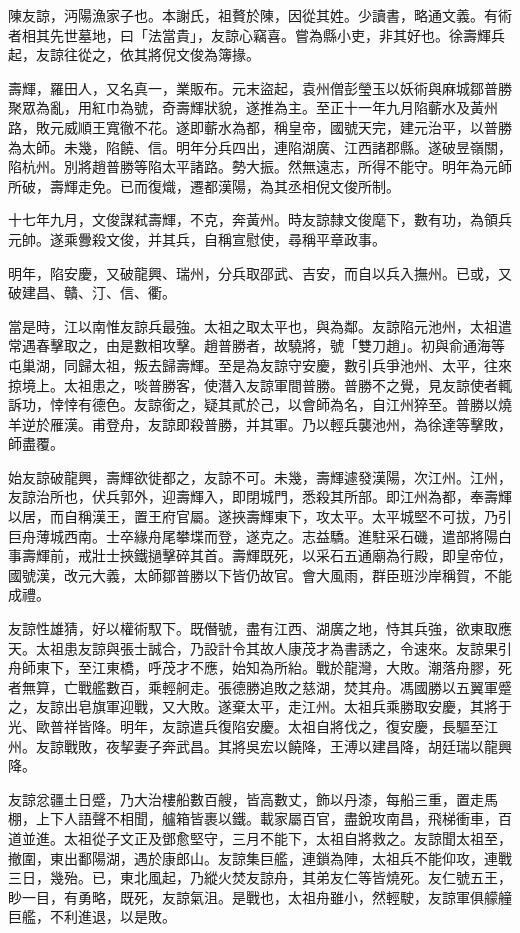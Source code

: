 

陳友諒，沔陽漁家子也。本謝氏，祖贅於陳，因從其姓。少讀書，略通文義。有術者相其先世墓地，曰「法當貴」，友諒心竊喜。嘗為縣小吏，非其好也。徐壽輝兵起，友諒往從之，依其將倪文俊為簿掾。

壽輝，羅田人，又名真一，業販布。元末盜起，袁州僧彭瑩玉以妖術與麻城鄒普勝聚眾為亂，用紅巾為號，奇壽輝狀貌，遂推為主。至正十一年九月陷蘄水及黃州路，敗元威順王寬徹不花。遂即蘄水為都，稱皇帝，國號天完，建元治平，以普勝為太師。未幾，陷饒、信。明年分兵四出，連陷湖廣、江西諸郡縣。遂破昱嶺關，陷杭州。別將趙普勝等陷太平諸路。勢大振。然無遠志，所得不能守。明年為元師所破，壽輝走免。已而復熾，遷都漢陽，為其丞相倪文俊所制。

十七年九月，文俊謀弒壽輝，不克，奔黃州。時友諒隸文俊麾下，數有功，為領兵元帥。遂乘釁殺文俊，并其兵，自稱宣慰使，尋稱平章政事。

明年，陷安慶，又破龍興、瑞州，分兵取邵武、吉安，而自以兵入撫州。已或，又破建昌、贛、汀、信、衢。

當是時，江以南惟友諒兵最強。太祖之取太平也，與為鄰。友諒陷元池州，太祖遣常遇春擊取之，由是數相攻擊。趙普勝者，故驍將，號「雙刀趙」。初與俞通海等屯巢湖，同歸太祖，叛去歸壽輝。至是為友諒守安慶，數引兵爭池州、太平，往來掠境上。太祖患之，啖普勝客，使潛入友諒軍間普勝。普勝不之覺，見友諒使者輒訴功，悻悻有德色。友諒銜之，疑其貳於己，以會師為名，自江州猝至。普勝以燒羊逆於雁漢。甫登舟，友諒即殺普勝，并其軍。乃以輕兵襲池州，為徐達等擊敗，師盡覆。

始友諒破龍興，壽輝欲徙都之，友諒不可。未幾，壽輝遽發漢陽，次江州。江州，友諒治所也，伏兵郭外，迎壽輝入，即閉城門，悉殺其所部。即江州為都，奉壽輝以居，而自稱漢王，置王府官屬。遂挾壽輝東下，攻太平。太平城堅不可拔，乃引巨舟薄城西南。士卒緣舟尾攀堞而登，遂克之。志益驕。進駐采石磯，遣部將陽白事壽輝前，戒壯士挾鐵撾擊碎其首。壽輝既死，以采石五通廟為行殿，即皇帝位，國號漢，改元大義，太師鄒普勝以下皆仍故官。會大風雨，群臣班沙岸稱賀，不能成禮。

友諒性雄猜，好以權術馭下。既僭號，盡有江西、湖廣之地，恃其兵強，欲東取應天。太祖患友諒與張士誠合，乃設計令其故人康茂才為書誘之，令速來。友諒果引舟師東下，至江東橋，呼茂才不應，始知為所紿。戰於龍灣，大敗。潮落舟膠，死者無算，亡戰艦數百，乘輕舸走。張德勝追敗之慈湖，焚其舟。馮國勝以五翼軍蹙之，友諒出皂旗軍迎戰，又大敗。遂棄太平，走江州。太祖兵乘勝取安慶，其將于光、歐普祥皆降。明年，友諒遣兵復陷安慶。太祖自將伐之，復安慶，長驅至江州。友諒戰敗，夜挈妻子奔武昌。其將吳宏以饒降，王溥以建昌降，胡廷瑞以龍興降。

友諒忿疆土日蹙，乃大治樓船數百艘，皆高數丈，飾以丹漆，每船三重，置走馬棚，上下人語聲不相聞，艫箱皆裹以鐵。載家屬百官，盡銳攻南昌，飛梯衝車，百道並進。太祖從子文正及鄧愈堅守，三月不能下，太祖自將救之。友諒聞太祖至，撤圍，東出鄱陽湖，遇於康郎山。友諒集巨艦，連鎖為陣，太祖兵不能仰攻，連戰三日，幾殆。已，東北風起，乃縱火焚友諒舟，其弟友仁等皆燒死。友仁號五王，眇一目，有勇略，既死，友諒氣沮。是戰也，太祖舟雖小，然輕駛，友諒軍俱艨艟巨艦，不利進退，以是敗。

